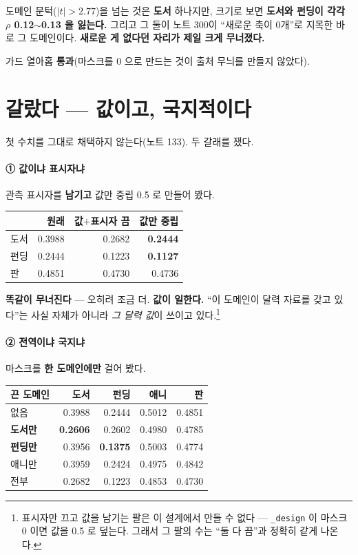 \documentclass[10pt]{article}
\begin{document}
도메인 문턱($|t|{>}2.77$)을 넘는 것은 \textbf{도서} 하나지만, 크기로 보면
\textbf{도서와 펀딩이 각각 $\rho$ 0.12$\sim$0.13 을 잃는다.} 그리고 그 둘이
노트 300이 ``새로운 축이 0개''로 지목한 바로 그 도메인이다. \textbf{새로운
게 없다던 자리가 제일 크게 무너졌다.}

가드 열아홉 \textbf{통과}(마스크를 0 으로 만드는 것이 출처 무늬를 만들지
않았다).

\section{갈랐다 --- 값이고, 국지적이다}

첫 수치를 그대로 채택하지 않는다(노트 133). 두 갈래를 쟀다.

\paragraph{① 값이냐 표시자냐} 관측 표시자를 \textbf{남기고} 값만 중립
0.5 로 만들어 봤다.

\begin{center}\footnotesize
\begin{tabular}{lrrr}
\hline
& 원래 & 값$+$표시자 끔 & \textbf{값만 중립} \\
\hline
도서 & 0.3988 & 0.2682 & \textbf{0.2444} \\
펀딩 & 0.2444 & 0.1223 & \textbf{0.1127} \\
판 & 0.4851 & 0.4730 & 0.4736 \\
\hline
\end{tabular}
\end{center}

\textbf{똑같이 무너진다} --- 오히려 조금 더. \textbf{값이 일한다.} ``이
도메인이 달력 자료를 갖고 있다''는 사실 자체가 아니라 \emph{그 달력 값}이
쓰이고 있다.\footnote{표시자만 끄고 값을 남기는 팔은 이 설계에서 만들 수
없다 --- \texttt{\_design} 이 마스크 0 이면 값을 0.5 로 덮는다. 그래서
그 팔의 수는 ``둘 다 끔''과 정확히 같게 나온다.}

\paragraph{② 전역이냐 국지냐} 마스크를 \textbf{한 도메인에만} 걸어 봤다.

\begin{center}\footnotesize
\begin{tabular}{lrrrr}
\hline
끈 도메인 & 도서 & 펀딩 & 애니 & 판 \\
\hline
없음 & 0.3988 & 0.2444 & 0.5012 & 0.4851 \\
\textbf{도서만} & \textbf{0.2606} & 0.2602 & 0.4980 & 0.4785 \\
\textbf{펀딩만} & 0.3956 & \textbf{0.1375} & 0.5003 & 0.4774 \\
애니만 & 0.3959 & 0.2424 & 0.4975 & 0.4842 \\
전부 & 0.2682 & 0.1223 & 0.4853 & 0.4730 \\
\hline
\end{tabular}
\end{center}
\end{document}
